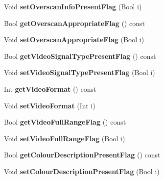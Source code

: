 \begin{DoxyCompactItemize}
\item 
\mbox{\label{class_t_com_v_u_i_abc276aefd3a62d00f60dadafa014c00e}} 
Void {\bfseries set\+Overscan\+Info\+Present\+Flag} (Bool i)
\item 
\mbox{\label{class_t_com_v_u_i_a04cf498fa22bad04ae4e1baf2a4ccae1}} 
Bool {\bfseries get\+Overscan\+Appropriate\+Flag} () const
\item 
\mbox{\label{class_t_com_v_u_i_a402f7d5a49b173cf52db55c0ecb35f0b}} 
Void {\bfseries set\+Overscan\+Appropriate\+Flag} (Bool i)
\item 
\mbox{\label{class_t_com_v_u_i_a146347736eeede3042ceb13f5b55b303}} 
Bool {\bfseries get\+Video\+Signal\+Type\+Present\+Flag} () const
\item 
\mbox{\label{class_t_com_v_u_i_aa5c2fe1ead27fcdb18d62e60e47012b1}} 
Void {\bfseries set\+Video\+Signal\+Type\+Present\+Flag} (Bool i)
\item 
\mbox{\label{class_t_com_v_u_i_a021eed96a4b99fb2cc896930f1bb9678}} 
Int {\bfseries get\+Video\+Format} () const
\item 
\mbox{\label{class_t_com_v_u_i_a95ec4f3b193b7c82059d1b6444a0003a}} 
Void {\bfseries set\+Video\+Format} (Int i)
\item 
\mbox{\label{class_t_com_v_u_i_a676de238f2dd963f2b9ba280912b5ae6}} 
Bool {\bfseries get\+Video\+Full\+Range\+Flag} () const
\item 
\mbox{\label{class_t_com_v_u_i_a2b3a6cdff872f80ef4c074c5bd3a455e}} 
Void {\bfseries set\+Video\+Full\+Range\+Flag} (Bool i)
\item 
\mbox{\label{class_t_com_v_u_i_a82e25fbeafdd69d1451d9bdee639a249}} 
Bool {\bfseries get\+Colour\+Description\+Present\+Flag} () const
\item 
\mbox{\label{class_t_com_v_u_i_adb2febfb77ca28d43663612ef4aa0031}} 
Void {\bfseries set\+Colour\+Description\+Present\+Flag} (Bool i)

\end{DoxyCompactItemize}
